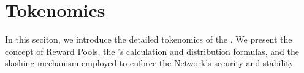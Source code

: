 \section{Tokenomics}
\label{sec:tokenomics}

In this seciton, we introduce the detailed tokenomics of the . We present the concept of Reward Pools, the 's calculation and distribution formulas, and the slashing mechanism employed to enforce the Network's security and stability.









